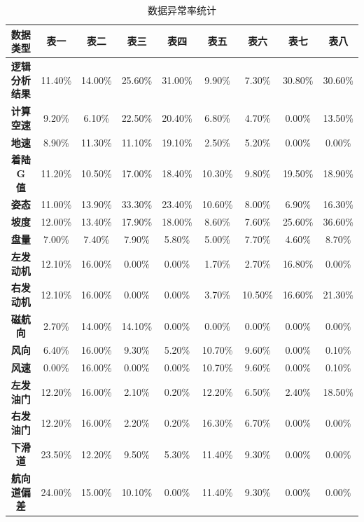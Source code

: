 \documentclass[UTF8]{ctexart}
\begin{document}
	\begin{table}[!ht]
		\centering
		\caption{数据异常率统计}
		\begin{tabular}{|c|cccccccc|}
			\hline
			\textbf{数据类型 } & \textbf{表一 } & \textbf{表二 } & \textbf{表三 } & \textbf{表四 } & \textbf{表五 } & \textbf{表六 } & \textbf{表七 } & \textbf{表八 } \\ \hline
			\textbf{逻辑分析结果 } & 11.40\% & 14.00\% & 25.60\% & 31.00\% & 9.90\% & 7.30\% & 30.80\% & 30.60\% \\ 
			\textbf{计算空速 } & 9.20\% & 6.10\% & 22.50\% & 20.40\% & 6.80\% & 4.70\% & 0.00\% & 13.50\% \\ 
			\textbf{地速 } & 8.90\% & 11.30\% & 11.10\% & 19.10\% & 2.50\% & 5.20\% & 0.00\% & 0.00\% \\ 
			\textbf{着陆 G 值 } & 11.20\% & 10.50\% & 17.00\% & 18.40\% & 10.30\% & 9.80\% & 19.50\% & 18.90\% \\ 
			\textbf{姿态 } & 11.00\% & 13.90\% & 33.30\% & 23.40\% & 10.60\% & 8.00\% & 6.90\% & 16.30\% \\ 
			\textbf{坡度 } & 12.00\% & 13.40\% & 17.90\% & 18.00\% & 8.60\% & 7.60\% & 25.60\% & 36.60\% \\ 
			\textbf{盘量 } & 7.00\% & 7.40\% & 7.90\% & 5.80\% & 5.00\% & 7.70\% & 4.60\% & 8.70\% \\ 
			\textbf{左发动机 } & 12.10\% & 16.00\% & 0.00\% & 0.00\% & 1.70\% & 2.70\% & 16.80\% & 0.00\% \\ 
			\textbf{右发动机 } & 12.10\% & 16.00\% & 0.00\% & 0.00\% & 3.70\% & 10.50\% & 16.60\% & 21.30\% \\ 
			\textbf{磁航向 } & 2.70\% & 14.00\% & 14.10\% & 0.00\% & 0.00\% & 0.00\% & 0.00\% & 0.00\% \\ 
			\textbf{风向 } & 6.40\% & 16.00\% & 9.30\% & 5.20\% & 10.70\% & 9.60\% & 0.00\% & 0.10\% \\ 
			\textbf{风速 } & 0.00\% & 16.00\% & 0.00\% & 0.00\% & 10.70\% & 9.60\% & 0.00\% & 0.10\% \\ 
			\textbf{左发油门 } & 12.20\% & 16.00\% & 2.10\% & 0.20\% & 12.20\% & 6.50\% & 2.40\% & 18.50\% \\ 
			\textbf{右发油门 } & 12.20\% & 16.00\% & 2.20\% & 0.20\% & 16.30\% & 6.70\% & 0.00\% & 0.00\% \\ 
			\textbf{下滑道 } & 23.50\% & 12.20\% & 9.50\% & 5.30\% & 11.40\% & 9.30\% & 0.00\% & 0.00\% \\ 
			\textbf{航向道偏差 } & 24.00\% & 15.00\% & 10.10\% & 0.00\% & 11.40\% & 9.30\% & 0.00\% & 0.00\% \\ \hline
		\end{tabular}
	\end{table}\par 
\end{document}
